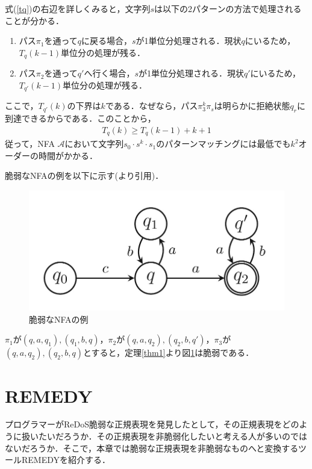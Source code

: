 \documentclass[a4paper, 12pt, dvipdfmx, uplatex]{jsreport}
\begin{document}
式(\ref{tq})の右辺を詳しくみると，文字列$s$は以下の2パターンの方法で処理されることが分かる．
\begin{enumerate}
  \item パス$\pi_1$を通って$q$に戻る場合，$s$が1単位分処理される．現状$q$にいるため，$T_q(k-1)$単位分の処理が残る．
  \item パス$\pi_2$を通って$q'$へ行く場合，$s$が1単位分処理される．現状$q'$にいるため，$T_{q'}(k-1)$単位分の処理が残る．
\end{enumerate}

ここで，$T_{q'}(k)$の下界は$k$である．なぜなら，パス$\pi_3^k \pi_s$は明らかに拒絶状態$q_r$に到達できるからである．このことから，
\begin{align*}
  T_q(k)\geq T_q(k-1)+k+1
\end{align*}
従って，NFA $\mathcal{A}$において文字列$s_0\cdot s^k\cdot s_1$のパターンマッチングには最低でも$k^2$オーダーの時間がかかる．

脆弱なNFAの例を以下に示す(\cite{vul_detect}より引用)．
\begin{figure}[H] %
  \centering
  \includegraphics[width=0.75\linewidth]{../figures/vul_ex.jpg}
  \caption{脆弱なNFAの例\label{vul_ex}}
\end{figure}

$\pi_1$が$(q,a,q_1),(q_1,b,q)$，$\pi_2$が$(q,a,q_2),(q_2,b,q')$，$\pi_3$が$(q,a,q_2),(q_2,b,q)$とすると，定理\ref{thm1}より図\ref{vul_ex}は脆弱である．




\section{REMEDY}\label{sec_remedy}
プログラマーがReDoS脆弱な正規表現を発見したとして，その正規表現をどのように扱いたいだろうか．その正規表現を非脆弱化したいと考える人が多いのではないだろうか．そこで，本章では脆弱な正規表現を非脆弱なものへと変換するツールREMEDY\cite{remedy}を紹介する．
\end{document}
